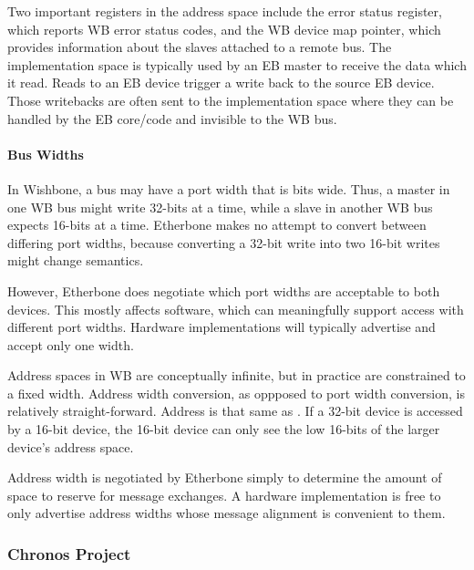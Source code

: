 \noindent Two important registers in the address space include the error status register, which reports WB error status codes, and the WB device map
pointer, which provides information about the slaves attached to a remote bus. 
The implementation space is typically used by an EB master to receive the data which it read. 
Reads to an EB device trigger a write back to the source EB device. 
Those writebacks are often sent to the implementation space where they can be handled by the EB core/code and invisible to the WB bus.

\paragraph{Bus Widths}

In Wishbone, a bus may have a port width that is  bits wide.
Thus, a master in one WB bus might write 32-bits at a time, while a slave in another WB bus expects 16-bits at a time. 
Etherbone makes no attempt to convert between differing port widths, because converting a 32-bit write into two 16-bit writes might change semantics.

\vspace{5 mm}

\noindent However, Etherbone does negotiate which port widths are acceptable to both devices. 
This mostly affects software, which can meaningfully support access with different port widths. 
Hardware implementations will typically advertise and accept only one width.

\vspace{5 mm}

\noindent Address spaces in WB are conceptually infinite, but in practice are constrained to a fixed width. 
Address width conversion, as oppposed to port width conversion, is relatively straight-forward. 
Address  is that same as . 
If a 32-bit device is accessed by a 16-bit device, the 16-bit device can only see the low 16-bits of the larger device's address space.

\vspace{5 mm}

\noindent Address width is negotiated by Etherbone simply to determine the amount of space to reserve for message exchanges. 
A hardware implementation is free to only advertise address widths whose message alignment is convenient to them.

\subsubsection{Chronos Project}

